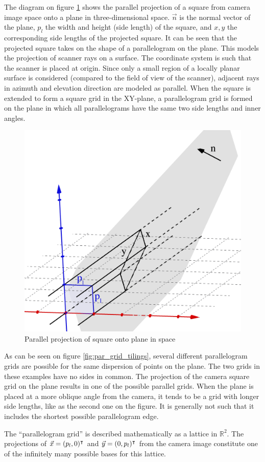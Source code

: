 The diagram on figure \ref{fig:pargrid_proj} shows the parallel projection of a square from camera image space onto a plane in three-dimensional space. $\vec{n}$ is the normal vector of the plane, $p_l$ the width and height (side length) of the square, and $x, y$ the corresponding side lengths of the projected square. It can be seen that the projected square takes on the shape of a parallelogram on the plane. This models the projection of scanner rays on a surface. The coordinate system is such that the scanner is placed at origin. Since only a small region of a locally planar surface is considered (compared to the field of view of the scanner), adjacent rays in azimuth and elevation direction are modeled as parallel. When the square is extended to form a square grid in the XY-plane, a parallelogram grid is formed on the plane in which all parallelograms have the same two side lengths and inner angles.

\begin{figure}[h]
\centering
\includegraphics[width=.3\textwidth]{fig/pargrid_proj.png}
\caption{Parallel projection of square onto plane in space}
\label{fig:pargrid_proj}
\end{figure}

As can be seen on figure \ref{fig:par_grid_tilings}, several different parallelogram grids are possible for the same dispersion of points on the plane. The two grids in these examples have no sides in common. The projection of the camera square grid on the plane results in one of the possible parallel grids. When the plane is placed at a more oblique angle from the camera, it tends to be a grid with longer side lengths, like as the second one on the figure. It is generally not such that it includes the shortest possible parallelogram edge.

The ``parallelogram grid'' is described mathematically as a lattice in $\mathbb{R}^2$. The projections of $\vec{x} = (p_l, 0)^\intercal$ and $\vec{y} = (0, p_l)^\intercal$ from the camera image constitute one of the infinitely many possible bases for this lattice. \cite{Galb2012}

